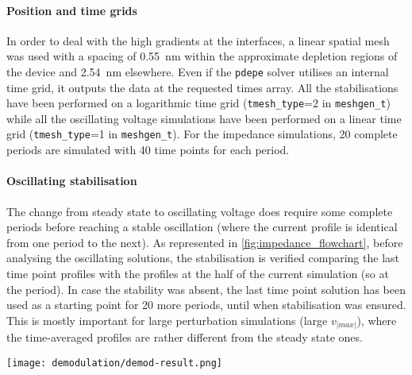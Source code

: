 	\paragraph{Position and time grids}
	In order to deal with the high gradients at the interfaces, a linear spatial mesh was used with a spacing of \SI{0.55}{\nm} within the approximate depletion regions of the device and \SI{2.54}{\nm} elsewhere.
	Even if the \texttt{pdepe} solver utilises an internal time grid, it outputs the data at the requested times array.
	All the stabilisations have been performed on a logarithmic time grid (\texttt{tmesh\_type}=2 in \texttt{meshgen_t}) while all the oscillating voltage simulations have been performed on a linear time grid (\texttt{tmesh\_type}=1 in \texttt{meshgen_t}).
	For the impedance simulations, 20 complete periods are simulated with 40 time points for each period.

	\paragraph{Oscillating stabilisation}
	The change from steady state to oscillating voltage does require some complete periods before reaching a stable oscillation (where the current profile is identical from one period to the next).
	As represented in \cref{fig:impedance_flowchart}, before analysing the oscillating solutions, the stabilisation is verified comparing the last time point profiles with the profiles at the half of the current simulation (so at the  period).
	In case the stability was absent, the last time point solution has been used as a starting point for 20 more periods, until when stabilisation was ensured.
	This is mostly important for large perturbation simulations (large $v_|max|$), where the time\hyp{}averaged profiles are rather different from the steady state ones.

	\begin{SCfigure}%
		\centering
		\texttt{[image: demodulation/demod-result.png]}
		\label{fig:demodulation}
	\end{SCfigure}

